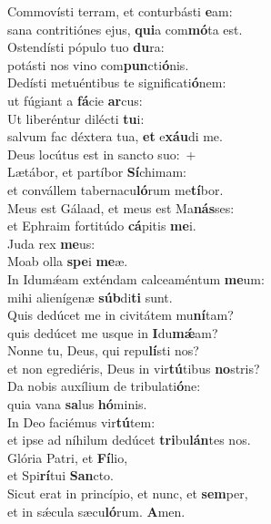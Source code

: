 \evenverse Commovísti terram, et conturbásti \textbf{e}am:~\*\\
\evenverse sana contritiónes ejus, \textbf{qui}a com\textbf{mó}ta est.\\
\oddverse Ostendísti pópulo tuo \textbf{du}ra:~\*\\
\oddverse potásti nos vino com\textbf{pun}cti\textbf{ó}nis.\\
\evenverse Dedísti metuéntibus te significati\textbf{ó}nem:~\*\\
\evenverse ut fúgiant a \textbf{fá}cie \textbf{ar}cus:\\
\oddverse Ut liberéntur dilécti \textbf{tu}i:~\*\\
\oddverse salvum fac déxtera tua, \textbf{et} e\textbf{xáu}di me.\\
\evenverse Deus locútus est in sancto suo:~+\\
\evenverse  Lætábor, et partíbor \textbf{Sí}chimam:~\*\\
\evenverse et convállem tabernacu\textbf{ló}rum me\textbf{tí}bor.\\
\oddverse Meus est Gálaad, et meus est Ma\textbf{nás}ses:~\*\\
\oddverse et Ephraim fortitúdo \textbf{cá}pitis \textbf{me}i.\\
\evenverse Juda rex \textbf{me}us:~\*\\
\evenverse Moab olla \textbf{spe}i \textbf{me}æ.\\
\oddverse In Idumǽam exténdam calceaméntum \textbf{me}um:~\*\\
\oddverse mihi alienígenæ \textbf{súb}di\textbf{ti} sunt.\\
\evenverse Quis dedúcet me in civitátem mu\textbf{ní}tam?~\*\\
\evenverse quis dedúcet me usque in \textbf{I}du\textbf{mǽ}am?\\
\oddverse Nonne tu, Deus, qui repu\textbf{lí}sti nos?~\*\\
\oddverse et non egrediéris, Deus in vir\textbf{tú}tibus \textbf{no}stris?\\
\evenverse Da nobis auxílium de tribulati\textbf{ó}ne:~\*\\
\evenverse quia vana \textbf{sa}lus \textbf{hó}minis.\\
\oddverse In Deo faciémus vir\textbf{tú}tem:~\*\\
\oddverse et ipse ad níhilum dedúcet \textbf{tri}bu\textbf{lán}tes nos.\\
\evenverse Glória Patri, et \textbf{Fí}lio,~\*\\
\evenverse et Spi\textbf{rí}tui \textbf{San}cto.\\
\oddverse Sicut erat in princípio, et nunc, et \textbf{sem}per,~\*\\
\oddverse et in sǽcula sæcu\textbf{ló}rum. \textbf{A}men.\\
